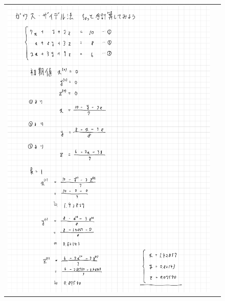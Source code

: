 \documentclass[a4paper, titlepage]{jsarticle}
\begin{document}
\begin{figure}[ht]
\begin{tabular}{cc}
\begin{minipage}[t]{8.2cm}
						\includegraphics[keepaspectratio, scale=0.4]{GaussSeidel_1.pdf}
					\end{minipage} &
					\begin{minipage}[t]{8.2cm}
						\centering

\end{minipage}
\end{tabular}
\end{figure}
\end{document}
